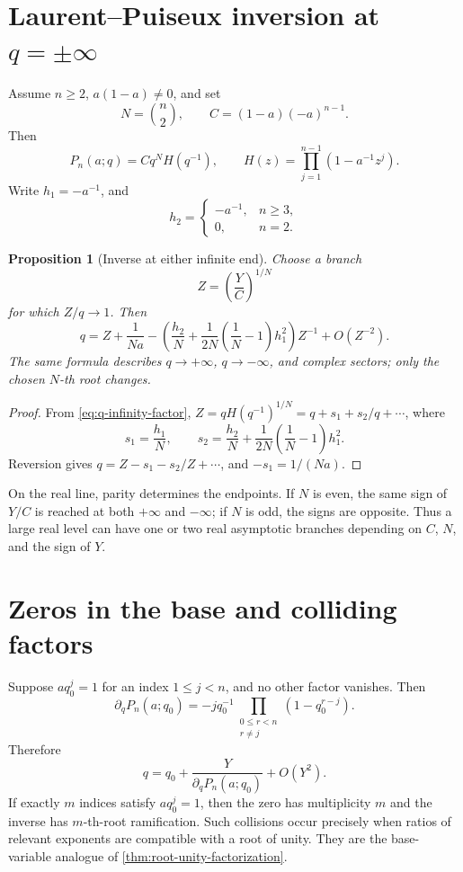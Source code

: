 \documentclass[11pt,a4paper,oneside,openany]{book}
\newtheorem{proposition}[theorem]{Proposition}
\theoremstyle{definition}
\theoremstyle{remark}
\begin{document}
\section{Laurent--Puiseux inversion at \texorpdfstring{$q=\pm\infty$}{q=+-infinity}}

Assume \(n\ge2\), \(a(1-a)\ne0\), and set
\[
 N=\binom n2,\qquad C=(1-a)(-a)^{n-1}.
\]
Then
\begin{equation}\label{eq:q-infinity-factor}
 P_n(a;q)=Cq^N H(q^{-1}),\qquad
 H(z)=\prod_{j=1}^{n-1}(1-a^{-1}z^j).
\end{equation}
Write \(h_1=-a^{-1}\), and
\[
 h_2=\begin{cases}-a^{-1},&n\ge3,\\0,&n=2.\end{cases}
\]

\begin{proposition}[Inverse at either infinite end]\label{prop:finite-q-infinity}
Choose a branch
\[
 Z=\left(\frac YC\right)^{1/N}
\]
for which \(Z/q\to1\).  Then
\begin{equation}\label{eq:finite-q-infinity-inverse}
 q=Z+\frac1{Na}
 -\left(\frac{h_2}{N}+\frac1{2N}\left(\frac1N-1\right)h_1^2\right)Z^{-1}
 +O(Z^{-2}).
\end{equation}
The same formula describes \(q\to+\infty\), \(q\to-\infty\), and complex
sectors; only the chosen \(N\)-th root changes.
\end{proposition}

\begin{proof}
From \eqref{eq:q-infinity-factor},
\(Z=qH(q^{-1})^{1/N}=q+s_1+s_2/q+\cdots\), where
\[
 s_1=\frac{h_1}{N},\qquad
 s_2=\frac{h_2}{N}+\frac1{2N}\left(\frac1N-1\right)h_1^2.
\]
Reversion gives \(q=Z-s_1-s_2/Z+\cdots\), and
\(-s_1=1/(Na)\).
\end{proof}

On the real line, parity determines the endpoints.  If \(N\) is even, the
same sign of \(Y/C\) is reached at both \(+\infty\) and \(-\infty\); if
\(N\) is odd, the signs are opposite.  Thus a large real level can have one
or two real asymptotic branches depending on \(C\), \(N\), and the sign of
\(Y\).

\section{Zeros in the base and colliding factors}

Suppose \(a q_0^j=1\) for an index \(1\le j<n\), and no other factor
vanishes.  Then
\begin{equation}\label{eq:q-root-derivative}
 \partial_qP_n(a;q_0)
 =-j q_0^{-1}\prod_{\substack{0\le r<n\\r\ne j}}(1-q_0^{r-j}).
\end{equation}
Therefore
\[
 q=q_0+\frac{Y}{\partial_qP_n(a;q_0)}+O(Y^2).
\]
If exactly \(m\) indices satisfy \(a q_0^j=1\), then the zero has
multiplicity \(m\) and the inverse has \(m\)-th-root ramification.  Such
collisions occur precisely when ratios of relevant exponents are compatible
with a root of unity.  They are the base-variable analogue of
\cref{thm:root-unity-factorization}.
\end{document}
